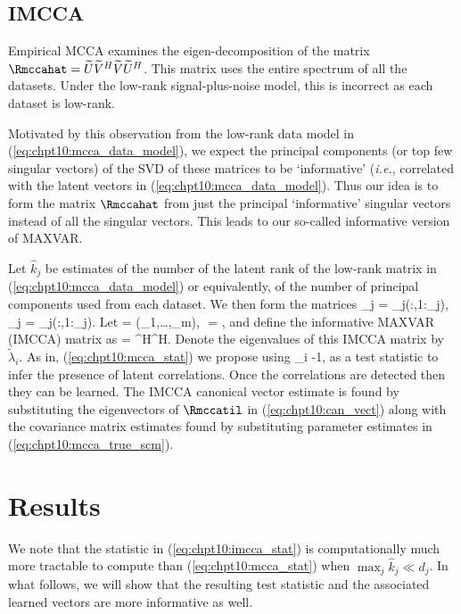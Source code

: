 \subsection{IMCCA}

Empirical MCCA examines the eigen-decomposition of the matrix $\Rmccahat =
\widetilde{U}\widetilde{V}^H\widetilde{V}\widetilde{U}^H$. This matrix uses the entire
spectrum of all the datasets. Under the low-rank
signal-plus-noise model, this is incorrect as each dataset is low-rank.

Motivated by this observation from the low-rank data model in
(\ref{eq:chpt10:mcca_data_model}), we expect the principal components (or top few singular
vectors) of the SVD of these matrices to be `informative' (\textit{i.e.}, correlated with
the latent vectors in (\ref{eq:chpt10:mcca_data_model}). Thus our idea is to form the
matrix $\Rmccahat$ from just the principal `informative' singular vectors instead of all
the singular vectors. This leads to our so-called informative version of MAXVAR.

Let $\widehat{k}_j$ be estimates of the number of the latent rank of the low-rank matrix in (\ref{eq:chpt10:mcca_data_model})  or equivalently, of the number of principal components used from each dataset. We then form the matrices
\be
\Ucir_j = _j\left(:,1:_j\right),\,\Vcir_j = _j\left(:,1:_j\right).
\ee
Let
\be
\Ucir = \blkdiag(\Ucir_1,\dots,\Ucir_m),\,\,\,\,\Vcir =
,
\ee
and define the informative MAXVAR (IMCCA) matrix as
\beq\label{eq:chpt10:rimcca}
\Rmccatil = \Ucir\Vcir^H\Vcir\Ucir^H.
\eeq
Denote the eigenvalues of this IMCCA matrix by $\widetilde{\lambda}_i$. As in,
(\ref{eq:chpt10:mcca_stat}) we propose using
\beq\label{eq:chpt10:imcca_stat}
\widetilde{\lambda}_i -1,
\eeq
as a test statistic to infer the presence of latent correlations. Once the correlations
are detected then they can be learned. The IMCCA canonical vector estimate is found by
substituting the eigenvectors of $\Rmccatil$ in (\ref{eq:chpt10:can_vect}) along with the
covariance matrix estimates found by substituting parameter estimates in
(\ref{eq:chpt10:mcca_true_scm}). 

\section{Results}\label{sec:results}
We note that the statistic in (\ref{eq:chpt10:imcca_stat}) is computationally much more tractable to compute than (\ref{eq:chpt10:mcca_stat}) when $\max_{j} \widehat{k}_{j} \ll d_j$.  In what follows, we will show that the resulting test statistic and the associated learned vectors are more informative as well.
